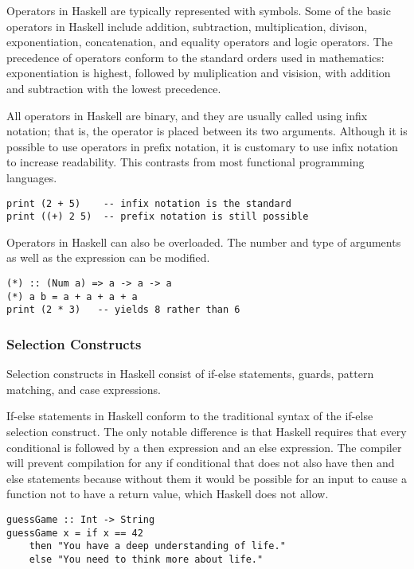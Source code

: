 \documentclass[titlepage,12pt]{article}
\begin{document}
Operators in Haskell are typically represented with symbols. Some of the basic operators in Haskell include addition, 
subtraction, multiplication, divison, exponentiation, concatenation, and equality operators and logic operators. The 
precedence of operators conform to the standard orders used in mathematics: exponentiation is highest, followed by 
muliplication and visision, with addition and subtraction with the lowest precedence.  

All operators in Haskell are binary, and they are usually called using infix notation; that is, the operator is 
placed between its two arguments. Although it is possible to use operators in prefix notation, it is customary to use 
infix notation to increase readability. This contrasts from most functional programming languages. 

\begin{verbatim}
print (2 + 5)    -- infix notation is the standard
print ((+) 2 5)  -- prefix notation is still possible
\end{verbatim}

Operators in Haskell can also be overloaded. The number and type of arguments as well as the expression can be modified. 

\begin{verbatim}
(*) :: (Num a) => a -> a -> a
(*) a b = a + a + a + a
print (2 * 3)   -- yields 8 rather than 6
\end{verbatim}

\subsubsection{Selection Constructs}

Selection constructs in Haskell consist of if-else statements, guards, pattern matching, and case expressions. 

If-else statements in Haskell conform to the traditional syntax of the if-else selection construct. The only notable 
difference is that Haskell requires that every conditional is followed by a then expression and an else expression. 
The compiler will prevent compilation for any if conditional that does not also have then and else statements because 
without them it would be possible for an input to cause a function not to have a return value, which Haskell does not allow.

\begin{verbatim}
guessGame :: Int -> String
guessGame x = if x == 42
    then "You have a deep understanding of life."
    else "You need to think more about life."
\end{verbatim}
\end{document}
